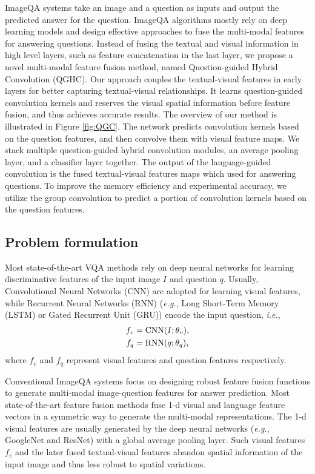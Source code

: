 \documentclass[runningheads]{llncs}
\begin{document}
ImageQA systems take an image and a question as inputs and output the predicted answer for the question. ImageQA algorithms mostly rely on deep learning models and design effective approaches to fuse the multi-modal features for answering questions. Instead of fusing the textual and visual information in high level layers, such as feature concatenation in the last layer, we propose a novel multi-modal feature fusion method, named Question-guided Hybrid Convolution (QGHC). Our approach couples the textual-visual features in early layers for better capturing textual-visual relationships. It learns question-guided convolution kernels and reserves the visual spatial information before feature fusion, and thus achieves accurate results.
The overview of our method is illustrated in Figure \ref{fig:QGC}. The network predicts convolution kernels based on the question features, and then convolve them with visual feature maps. We stack multiple question-guided hybrid convolution modules, an average pooling layer, and a classifier layer together. The output of the language-guided convolution is the fused textual-visual features maps which used for answering questions. To improve the memory efficiency and experimental accuracy, we utilize the group convolution to predict a portion of convolution kernels based on the question features.

\subsection{Problem formulation}
\label{sec:problem}

Most state-of-the-art VQA methods rely on deep neural networks for learning discriminative features of the input image $I$ and question $q$. Usually, Convolutional Neural Networks (CNN) are adopted for learning visual features, while Recurrent Neural Networks (RNN) (\textit{e.g.}, Long Short-Term Memory (LSTM) or Gated Recurrent Unit (GRU)) encode the input question, \textit{i.e.},
\begin{align}
  f_v &= \textnormal{CNN} (I; \theta_v), \label{eq:visual} \\
  f_q &= \textnormal{RNN} (q; \theta_q), \label{eq:language}
\end{align}
where $f_v$ and $f_q$ represent visual features and question features respectively.


Conventional ImageQA systems focus on designing robust feature fusion functions to generate multi-modal image-question features for answer prediction.
Most state-of-the-art feature fusion methods fuse 1-d visual and language feature vectors in a symmetric way to generate the multi-modal representations. The 1-d visual features are usually generated by the deep neural networks (\textit{e.g.}, GoogleNet and ResNet) with a global average pooling layer. Such visual features $f_v$ and the later fused textual-visual features abandon spatial information of the input image and thus less robust to spatial variations. 
\end{document}
